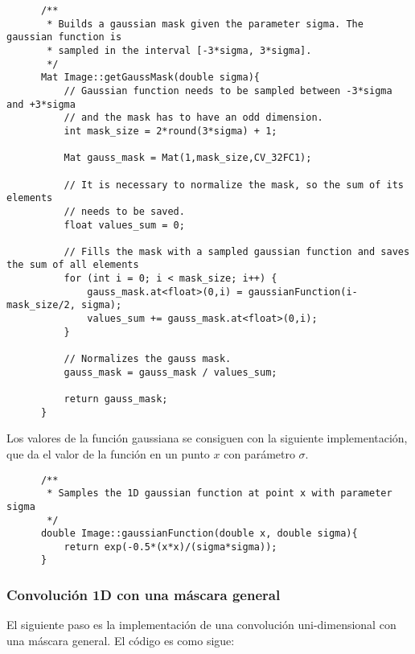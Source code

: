 \documentclass[a4paper, 11pt]{article}
\theoremstyle{definition}
\theoremstyle{theorem}
\begin{document}
  \begin{lstlisting}
      /**
       * Builds a gaussian mask given the parameter sigma. The gaussian function is
       * sampled in the interval [-3*sigma, 3*sigma].
       */
      Mat Image::getGaussMask(double sigma){
          // Gaussian function needs to be sampled between -3*sigma and +3*sigma
          // and the mask has to have an odd dimension.
          int mask_size = 2*round(3*sigma) + 1;

          Mat gauss_mask = Mat(1,mask_size,CV_32FC1);

          // It is necessary to normalize the mask, so the sum of its elements
          // needs to be saved.
          float values_sum = 0;

          // Fills the mask with a sampled gaussian function and saves the sum of all elements
          for (int i = 0; i < mask_size; i++) {
              gauss_mask.at<float>(0,i) = gaussianFunction(i-mask_size/2, sigma);
              values_sum += gauss_mask.at<float>(0,i);
          }

          // Normalizes the gauss mask.
          gauss_mask = gauss_mask / values_sum;

          return gauss_mask;
      }
  \end{lstlisting}

  Los valores de la función gaussiana se consiguen con la siguiente implementación, que da el valor de la función en un punto $x$ con parámetro $\sigma$.
  \begin{lstlisting}
      /**
       * Samples the 1D gaussian function at point x with parameter sigma
       */
      double Image::gaussianFunction(double x, double sigma){
          return exp(-0.5*(x*x)/(sigma*sigma));
      }
  \end{lstlisting}

  \subsubsection{Convolución 1D con una máscara general}

  El siguiente paso es la implementación de una convolución uni-dimensional con una máscara general. El código es como sigue:
\end{document}
